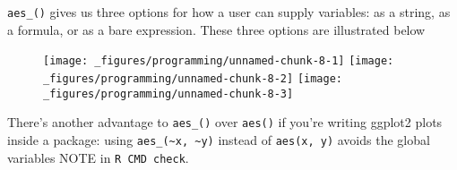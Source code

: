 \texttt{aes\_()} gives us three options for how a user can supply
variables: as a string, as a formula, or as a bare expression. These
three options are illustrated below

\begin{Shaded}
\begin{Highlighting}[]
\StringTok{ }
  \NormalTok{(~}\NormalTok{(}\NormalTok{), } 
\NormalTok{\}}
\NormalTok{) +}\StringTok{ }\NormalTok{(} \NormalTok{)}

\StringTok{ }
  \NormalTok{(~}\NormalTok{(}\NormalTok{), } 
\NormalTok{\}}
\StringTok{ }\NormalTok{(} \NormalTok{)}

\StringTok{ }
  \NormalTok{(~}\NormalTok{(}\NormalTok{), } 
\NormalTok{\}}
\StringTok{ }\NormalTok{(} \NormalTok{)}
\end{Highlighting}
\end{Shaded}

\begin{figure}[H]
  \texttt{[image: \_figures/programming/unnamed-chunk-8-1]}%
  \texttt{[image: \_figures/programming/unnamed-chunk-8-2]}%
  \texttt{[image: \_figures/programming/unnamed-chunk-8-3]}
\end{figure}

There's another advantage to \texttt{aes\_()} over \texttt{aes()} if
you're writing ggplot2 plots inside a package: using
\texttt{aes\_(\textasciitilde{}x,\ \textasciitilde{}y)} instead of
\texttt{aes(x,\ y)} avoids the global variables NOTE in
\texttt{R\ CMD\ check}. 

